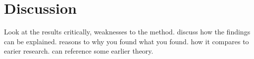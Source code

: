 \section{Discussion}
{\color{red}Look at the results critically, weaknesses to the method. discuss how the findings can be explained. reasons to why you found what you found. how it compares to earier research. can reference some earlier theory.}
